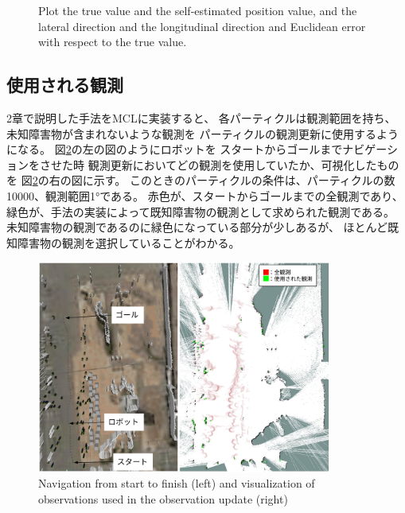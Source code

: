 \documentclass{jarticle}
\begin{document}
\begin{figure}[htbp]
\begin{center}
\begin{tabular}{cc}
  \end{tabular}
  \caption{
    Plot the true value and the self-estimated position value,
     and the lateral direction and the longitudinal 
    direction and Euclidean error with respect to the true value.}
  \label{fig: plot}
  \end{center}
\end{figure}

\subsection{使用される観測}

2章で説明した手法をMCLに実装すると、
各パーティクルは観測範囲を持ち、
未知障害物が含まれないような観測を
パーティクルの観測更新に使用するようになる。
図\ref{fig: スタートからゴールまでナビゲーション}の左の図のようにロボットを
スタートからゴールまでナビゲーションをさせた時
観測更新においてどの観測を使用していたか、可視化したものを
図\ref{fig: スタートからゴールまでナビゲーション}の右の図に示す。
このときのパーティクルの条件は、パーティクルの数10000、観測範囲1°である。
赤色が、スタートからゴールまでの全観測であり、
緑色が、手法の実装によって既知障害物の観測として求められた観測である。
未知障害物の観測であるのに緑色になっている部分が少しあるが、
ほとんど既知障害物の観測を選択していることがわかる。

\begin{figure}[t]
  \centering
   \includegraphics[height=70mm]{fig/particle_1000_observation_1_mcl.png}
   \vspace*{-4mm}
   \caption{Navigation from start to finish (left) and visualization of observations used in the observation update (right)}
   \label{fig: スタートからゴールまでナビゲーション}
\end{figure}

\end{document}
